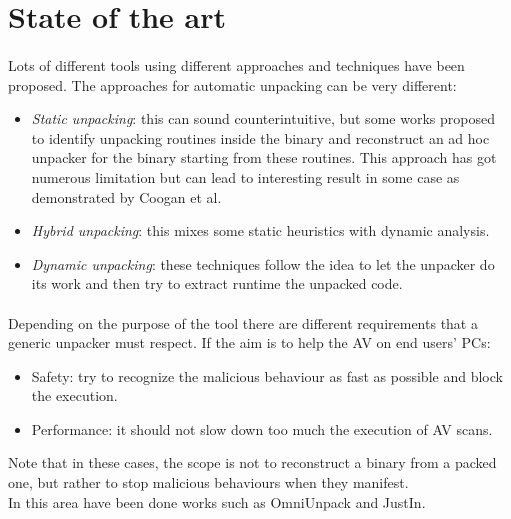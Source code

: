 \section{State of the art}
\paragraph{}
Lots of different tools using different approaches and techniques have been proposed. 
The approaches for automatic unpacking can be very different:
\begin{itemize}
\item \textit{Static unpacking}: this can sound counterintuitive, but some works proposed to identify unpacking routines inside the binary and reconstruct an ad hoc unpacker for the binary starting from these routines. This approach has got numerous limitation but can lead to interesting result in some case as demonstrated by Coogan et al.\cite{coogan}
\item \textit{Hybrid unpacking}: this mixes some static heuristics with dynamic analysis.
\item \textit{Dynamic unpacking}: these techniques follow the idea to let the unpacker do its work and then try to extract runtime the unpacked code. 
\end{itemize}
\paragraph{}
Depending on the purpose of the tool there are different requirements that a generic unpacker must respect. If the aim is to help the AV on end users' PCs:
\begin{itemize}
\item Safety: try to recognize the malicious behaviour as fast as possible and block the execution. 
\item Performance: it should not slow down too much the execution of AV scans.
\end{itemize}
Note that in these cases, the scope is not to reconstruct a binary from a packed one, but rather to stop malicious behaviours when they manifest. \\
In this area have been done works such as OmniUnpack and JustIn.
